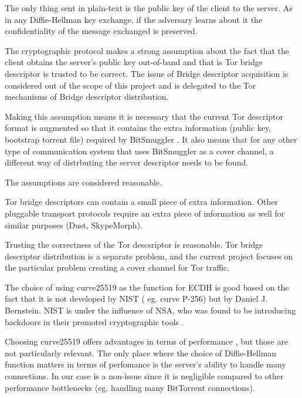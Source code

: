 \documentclass[11pt]{book} %
\newcommand{\projectName}{BitSmuggler }
\begin{document}
The only thing sent in plain-text is the public key of the client to the server. As in any Diffie-Hellman key exchange, if the adversary learns about it the confidentiality of the message exchanged is preserved.



The cryptographic protocol makes a strong assumption about the fact that the client obtains the server's public key out-of-band and that is Tor bridge descriptor is trusted to be correct. The issue of Bridge descriptor acquisition is considered out of the scope of this project and is delegated to the Tor mechanisms of Bridge descriptor distribution.

Making this assumption means it is necessary that the current Tor descriptor format is augmented so that it contains the extra information (public key, bootstrap torrent file) required by  \projectName . It also means that for any other type of communication system that uses \projectName as a cover channel, a different way of distrbuting the server descriptor needs to be found.

The assumptions are considered reasonable.

Tor bridge descriptors can contain a small piece of extra information. Other pluggable transport protocols require an extra piece of information as well for similar purposes (Dust, SkypeMorph).

Trusting the correctness of the Tor descsriptor is reasonable. Tor bridge descriptor distribution is a separate problem, and the current project focuses on the particular problem creating a cover channel for Tor traffic.


The choice of using curve25519 as the function for ECDH is good based on the fact that it is not developed by NIST ( eg. curve P-256) but by Daniel J. Bernstein. NIST is under the influence of NSA, who was found to be introducing backdoors in their promoted cryptographic tools \citep*{web:nsaBackdoor}.

Choosing curve25519 offers advantages in terms of performance \citep*{web:curve25519}, but those are not particularly relevant. The only place where the choice of Diffie-Hellman function matters in terms of perfomance is the server's ability to handle many connections. In our case is a non-issue since it is negligible compared to other performance bottlenecks (eg. handling many BitTorrent connections).
\end{document}
